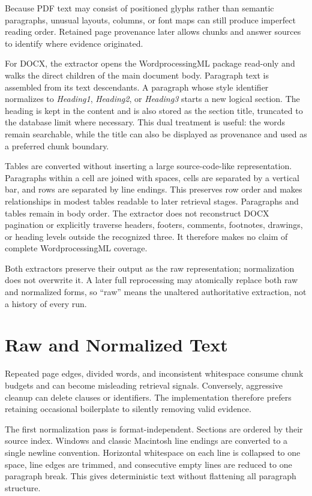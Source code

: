 Because PDF text may consist of positioned glyphs rather than semantic
paragraphs, unusual layouts, columns, or font maps can still produce imperfect
reading order. Retained page provenance later allows chunks and answer sources
to identify where evidence originated.

For DOCX, the extractor opens the WordprocessingML package read-only and walks
the direct children of the main document body. Paragraph text is assembled
from its text descendants. A paragraph whose style identifier normalizes to
\emph{Heading1}, \emph{Heading2}, or \emph{Heading3} starts a new logical
section. The heading is kept in the content and is also stored as the section
title, truncated to the database limit where necessary. This dual treatment
is useful: the words remain searchable, while the title can also be displayed
as provenance and used as a preferred chunk boundary.

Tables are converted without inserting a large source-code-like representation.
Paragraphs within a cell are joined with spaces, cells are separated by a
vertical bar, and rows are separated by line endings. This preserves row order
and makes relationships in modest tables readable to later retrieval stages.
Paragraphs and tables remain in body order. The extractor does not reconstruct
DOCX pagination or explicitly traverse headers, footers, comments, footnotes,
drawings, or heading levels outside the recognized three. It therefore makes
no claim of complete WordprocessingML coverage.

Both extractors preserve their output as the raw representation; normalization
does not overwrite it. A later full reprocessing may atomically replace both
raw and normalized forms, so ``raw'' means the unaltered authoritative
extraction, not a history of every run.

\section{Raw and Normalized Text}
\label{sec:text-normalization}

Repeated page edges, divided words, and inconsistent whitespace consume chunk
budgets and can become misleading retrieval signals. Conversely, aggressive
cleanup can delete clauses or identifiers. The implementation therefore
prefers retaining occasional boilerplate to silently removing valid evidence.

The first normalization pass is format-independent. Sections are ordered by
their source index. Windows and classic Macintosh line endings are converted to
a single newline convention. Horizontal whitespace on each line is collapsed
to one space, line edges are trimmed, and consecutive empty lines are reduced
to one paragraph break. This gives deterministic text without flattening all
paragraph structure.

